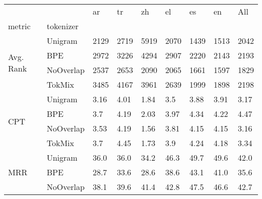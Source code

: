 \begin{table}
\centering
\begin{tabular}{lllllllll}
\toprule
     &        &                ar &                tr &                zh &                el &                es &                en &               All \\
metric & tokenizer &                   &                   &                   &                   &                   &                   &                   \\
\midrule
\multirow{4}{*}{Avg. Rank} & Unigram &              2129 &              2719 &              5919 &              2070 &              1439 &              1513 &              2042 \\
     & BPE &              2972 &              3226 &              4294 &              2907 &              2220 &              2143 &              2193 \\
     & NoOverlap &              2537 &              2653 &              2090 &              2065 &              1661 &              1597 &              1829 \\
     & TokMix &              3485 &              4167 &              3961 &              2639 &              1999 &              1898 &              2198 \\
\cline{1-9}
\multirow{4}{*}{CPT} & Unigram &              3.16 &              4.01 &              1.84 &               3.5 &              3.88 &              3.91 &              3.17 \\
     & BPE &               3.7 &              4.19 &              2.03 &              3.97 &              4.34 &              4.22 &              4.47 \\
     & NoOverlap &              3.53 &              4.19 &              1.56 &              3.81 &              4.15 &              4.15 &              3.16 \\
     & TokMix &               3.7 &              4.45 &              1.73 &               3.9 &              4.24 &              4.18 &              3.34 \\
\cline{1-9}
\multirow{4}{*}{MRR} & Unigram &              36.0 &              36.0 &              34.2 &              46.3 &              49.7 &              49.6 &              42.0 \\
     & BPE &              28.7 &              33.6 &              28.6 &              38.6 &              43.1 &              41.0 &              35.6 \\
     & NoOverlap &              38.1 &              39.6 &              41.4 &              42.8 &              47.5 &              46.6 &              42.7 \\

\end{tabular}
\end{table}
